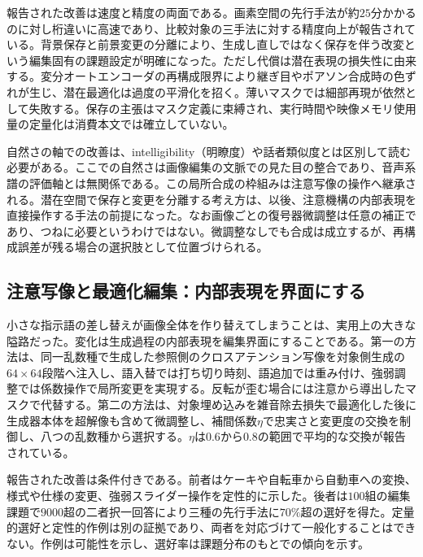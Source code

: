 \documentclass[lualatex,a4paper,10pt]{jlreq}
\begin{document}
報告された改善は速度と精度の両面である。画素空間の先行手法が約$25$分かかるのに対し桁違いに高速であり、比較対象の三手法に対する精度向上が報告されている\autocite{btd046}。背景保存と前景変更の分離により、生成し直しではなく保存を伴う改変という編集固有の課題設定が明確になった\autocite{btd046}。ただし代償は潜在表現の損失性に由来する。変分オートエンコーダの再構成限界により継ぎ目やポアソン合成時の色ずれが生じ、潜在最適化は過度の平滑化を招く\autocite{btd046}。薄いマスクでは細部再現が依然として失敗する。保存の主張はマスク定義に束縛され、実行時間や映像メモリ使用量の定量化は消費本文では確立していない\autocite{btd046}。

自然さの軸での改善は、intelligibility（明瞭度）や話者類似度とは区別して読む必要がある。ここでの自然さは画像編集の文脈での見た目の整合であり、音声系譜の評価軸とは無関係である\autocite{btd046}。この局所合成の枠組みは注意写像の操作へ継承される。潜在空間で保存と変更を分離する考え方は、以後、注意機構の内部表現を直接操作する手法の前提になった\autocite{btd046,btd047}。なお画像ごとの復号器微調整は任意の補正であり、つねに必要というわけではない。微調整なしでも合成は成立するが、再構成誤差が残る場合の選択肢として位置づけられる\autocite{btd046}。

\subsection{注意写像と最適化編集：内部表現を界面にする}
小さな指示語の差し替えが画像全体を作り替えてしまうことは、実用上の大きな隘路だった\autocite{btd047,btd048}。変化は生成過程の内部表現を編集界面にすることである。第一の方法は、同一乱数種で生成した参照側のクロスアテンション写像を対象側生成の$64 \times 64$段階へ注入し、語入替では打ち切り時刻、語追加では重み付け、強弱調整では係数操作で局所変更を実現する\autocite{btd047}。反転が歪む場合には注意から導出したマスクで代替する。第二の方法は、対象埋め込みを雑音除去損失で最適化した後に生成器本体を超解像も含めて微調整し、補間係数$\eta$で忠実さと変更度の交換を制御し、八つの乱数種から選択する\autocite{btd048}。$\eta$は$0.6$から$0.8$の範囲で平均的な交換が報告されている\autocite{btd048}。

報告された改善は条件付きである。前者はケーキや自転車から自動車への変換、様式や仕様の変更、強弱スライダー操作を定性的に示した\autocite{btd047}。後者は$100$組の編集課題で$9000$超の二者択一回答により三種の先行手法に$70\%$超の選好を得た\autocite{btd048}。定量的選好と定性的作例は別の証拠であり、両者を対応づけて一般化することはできない。作例は可能性を示し、選好率は課題分布のもとでの傾向を示す\autocite{btd047,btd048}。
\end{document}
